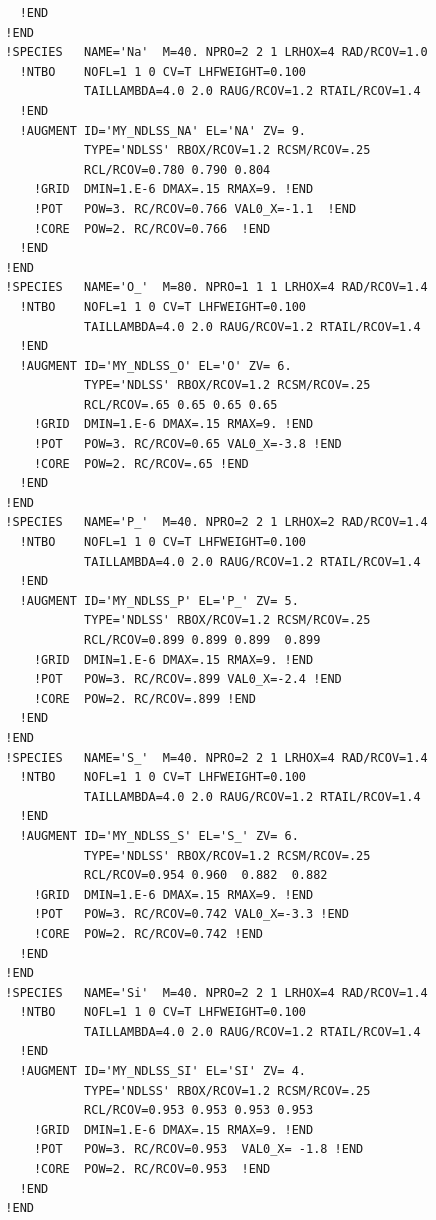 \documentclass{book}
\begin{document}
{\begin{verbatim}
    !END
  !END
  !SPECIES   NAME='Na'  M=40. NPRO=2 2 1 LRHOX=4 RAD/RCOV=1.0
    !NTBO    NOFL=1 1 0 CV=T LHFWEIGHT=0.100
             TAILLAMBDA=4.0 2.0 RAUG/RCOV=1.2 RTAIL/RCOV=1.4 
    !END 
    !AUGMENT ID='MY_NDLSS_NA' EL='NA' ZV= 9.
             TYPE='NDLSS' RBOX/RCOV=1.2 RCSM/RCOV=.25
             RCL/RCOV=0.780 0.790 0.804
      !GRID  DMIN=1.E-6 DMAX=.15 RMAX=9. !END
      !POT   POW=3. RC/RCOV=0.766 VAL0_X=-1.1  !END
      !CORE  POW=2. RC/RCOV=0.766  !END
    !END
  !END
  !SPECIES   NAME='O_'  M=80. NPRO=1 1 1 LRHOX=4 RAD/RCOV=1.4
    !NTBO    NOFL=1 1 0 CV=T LHFWEIGHT=0.100
             TAILLAMBDA=4.0 2.0 RAUG/RCOV=1.2 RTAIL/RCOV=1.4 
    !END 
    !AUGMENT ID='MY_NDLSS_O' EL='O' ZV= 6.
             TYPE='NDLSS' RBOX/RCOV=1.2 RCSM/RCOV=.25
             RCL/RCOV=.65 0.65 0.65 0.65
      !GRID  DMIN=1.E-6 DMAX=.15 RMAX=9. !END
      !POT   POW=3. RC/RCOV=0.65 VAL0_X=-3.8 !END
      !CORE  POW=2. RC/RCOV=.65 !END
    !END
  !END
  !SPECIES   NAME='P_'  M=40. NPRO=2 2 1 LRHOX=2 RAD/RCOV=1.4
    !NTBO    NOFL=1 1 0 CV=T LHFWEIGHT=0.100
             TAILLAMBDA=4.0 2.0 RAUG/RCOV=1.2 RTAIL/RCOV=1.4 
    !END 
    !AUGMENT ID='MY_NDLSS_P' EL='P_' ZV= 5.
             TYPE='NDLSS' RBOX/RCOV=1.2 RCSM/RCOV=.25
             RCL/RCOV=0.899 0.899 0.899  0.899 
      !GRID  DMIN=1.E-6 DMAX=.15 RMAX=9. !END
      !POT   POW=3. RC/RCOV=.899 VAL0_X=-2.4 !END
      !CORE  POW=2. RC/RCOV=.899 !END
    !END
  !END
  !SPECIES   NAME='S_'  M=40. NPRO=2 2 1 LRHOX=4 RAD/RCOV=1.4
    !NTBO    NOFL=1 1 0 CV=T LHFWEIGHT=0.100
             TAILLAMBDA=4.0 2.0 RAUG/RCOV=1.2 RTAIL/RCOV=1.4 
    !END 
    !AUGMENT ID='MY_NDLSS_S' EL='S_' ZV= 6.
             TYPE='NDLSS' RBOX/RCOV=1.2 RCSM/RCOV=.25
             RCL/RCOV=0.954 0.960  0.882  0.882
      !GRID  DMIN=1.E-6 DMAX=.15 RMAX=9. !END
      !POT   POW=3. RC/RCOV=0.742 VAL0_X=-3.3 !END
      !CORE  POW=2. RC/RCOV=0.742 !END
    !END
  !END
  !SPECIES   NAME='Si'  M=40. NPRO=2 2 1 LRHOX=4 RAD/RCOV=1.4
    !NTBO    NOFL=1 1 0 CV=T LHFWEIGHT=0.100
             TAILLAMBDA=4.0 2.0 RAUG/RCOV=1.2 RTAIL/RCOV=1.4 
    !END 
    !AUGMENT ID='MY_NDLSS_SI' EL='SI' ZV= 4.
             TYPE='NDLSS' RBOX/RCOV=1.2 RCSM/RCOV=.25
             RCL/RCOV=0.953 0.953 0.953 0.953 
      !GRID  DMIN=1.E-6 DMAX=.15 RMAX=9. !END
      !POT   POW=3. RC/RCOV=0.953  VAL0_X= -1.8 !END
      !CORE  POW=2. RC/RCOV=0.953  !END
    !END
  !END
\end{verbatim}
}




\end{document}
